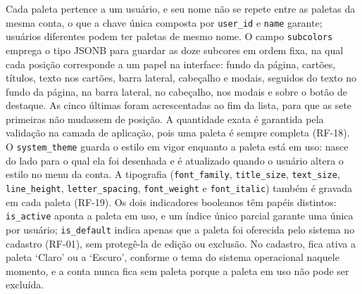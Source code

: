 Cada paleta pertence a um usuário, e seu nome não se repete entre as paletas da mesma conta, o que a chave única composta por \texttt{user\_id} e \texttt{name} garante; usuários diferentes podem ter paletas de mesmo nome. O campo \texttt{subcolors} emprega o tipo JSONB para guardar as doze subcores em ordem fixa, na qual cada posição corresponde a um papel na interface: fundo da página, cartões, títulos, texto nos cartões, barra lateral, cabeçalho e modais, seguidos do texto no fundo da página, na barra lateral, no cabeçalho, nos modais e sobre o botão de destaque. As cinco últimas foram acrescentadas ao fim da lista, para que as sete primeiras não mudassem de posição. A quantidade exata é garantida pela validação na camada de aplicação, pois uma paleta é sempre completa (RF-18). O \texttt{system\_theme} guarda o estilo em vigor enquanto a paleta está em uso: nasce do lado para o qual ela foi desenhada e é atualizado quando o usuário altera o estilo no menu da conta. A tipografia (\texttt{font\_family}, \texttt{title\_size}, \texttt{text\_size}, \texttt{line\_height}, \texttt{letter\_spacing}, \texttt{font\_weight} e \texttt{font\_italic}) também é gravada em cada paleta (RF-19). Os dois indicadores booleanos têm papéis distintos: \texttt{is\_active} aponta a paleta em uso, e um índice único parcial garante uma única por usuário; \texttt{is\_default} indica apenas que a paleta foi oferecida pelo sistema no cadastro (RF-01), sem protegê-la de edição ou exclusão. No cadastro, fica ativa a paleta `Claro' ou a `Escuro', conforme o tema do sistema operacional naquele momento, e a conta nunca fica sem paleta porque a paleta em uso não pode ser excluída.
\FloatBarrier









